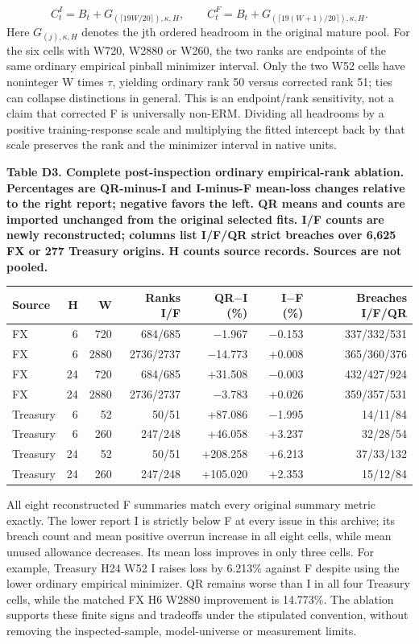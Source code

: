 \documentclass[10pt,a4paper]{article}
\begin{document}
\[
C^I_t=B_t+G_{(\lceil19W/20\rceil),\kappa,H},\qquad C^F_t=B_t+G_{(\lceil19(W+1)/20\rceil),\kappa,H}.
\]
Here \(G_{(j),\kappa,H}\) denotes the jth ordered headroom in the original mature pool. For the six cells with W720, W2880 or W260, the two ranks are endpoints of the same ordinary empirical pinball minimizer interval. Only the two W52 cells have noninteger W times \(\tau\), yielding ordinary rank 50 versus corrected rank 51; ties can collapse distinctions in general. This is an endpoint/rank sensitivity, not a claim that corrected F is universally non-ERM. Dividing all headrooms by a positive training-response scale and multiplying the fitted intercept back by that scale preserves the rank and the minimizer interval in native units.

\begin{center}
\begin{minipage}{\linewidth}
\small\textbf{Table D3. Complete post-inspection ordinary empirical-rank ablation. Percentages are QR-minus-I and I-minus-F mean-loss changes relative to the right report; negative favors the left. QR means and counts are imported unchanged from the original selected fits. I/F counts are newly reconstructed; columns list I/F/QR strict breaches over 6,625 FX or 277 Treasury origins. H counts source records. Sources are not pooled.}\par\medskip
\centering\fontsize{8}{10}\selectfont
\begin{tabular}{lrrrrrr}
\toprule
Source & H & W & Ranks I/F & QR\(-\)I (\%) & I\(-\)F (\%) & Breaches I/F/QR \\
\midrule
FX & 6 & 720 & 684/685 & \(-\)1.967 & \(-\)0.153 & 337/332/531 \\
FX & 6 & 2880 & 2736/2737 & \(-\)14.773 & +0.008 & 365/360/376 \\
FX & 24 & 720 & 684/685 & +31.508 & \(-\)0.003 & 432/427/924 \\
FX & 24 & 2880 & 2736/2737 & \(-\)3.783 & +0.026 & 359/357/531 \\
Treasury & 6 & 52 & 50/51 & +87.086 & \(-\)1.995 & 14/11/84 \\
Treasury & 6 & 260 & 247/248 & +46.058 & +3.237 & 32/28/54 \\
Treasury & 24 & 52 & 50/51 & +208.258 & +6.213 & 37/33/132 \\
Treasury & 24 & 260 & 247/248 & +105.020 & +2.353 & 15/12/84 \\
\bottomrule
\end{tabular}
\end{minipage}
\end{center}
All eight reconstructed F summaries match every original summary metric exactly. The lower report I is strictly below F at every issue in this archive; its breach count and mean positive overrun increase in all eight cells, while mean unused allowance decreases. Its mean loss improves in only three cells. For example, Treasury H24 W52 I raises loss by 6.213\% against F despite using the lower ordinary empirical minimizer. QR remains worse than I in all four Treasury cells, while the matched FX H6 W2880 improvement is 14.773\%. The ablation supports these finite signs and tradeoffs under the stipulated convention, without removing the inspected-sample, model-universe or measurement limits.
\end{document}
